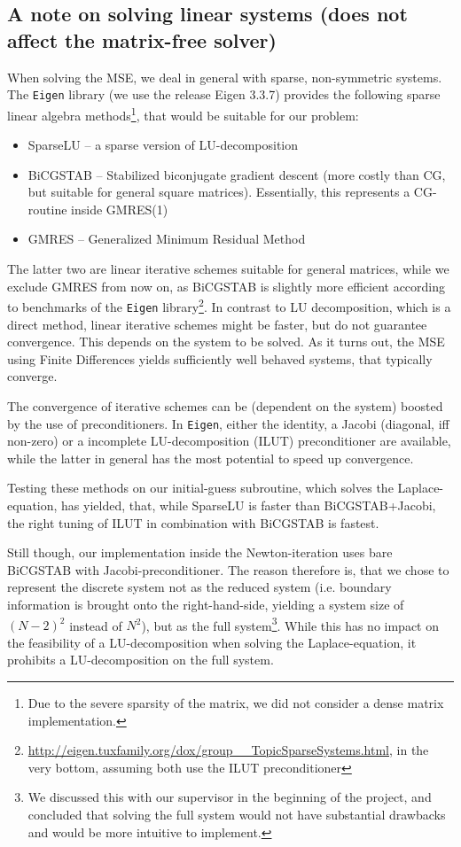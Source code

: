 \documentclass[11pt]{scrartcl}
\begin{document}
\subsection[A note on solving linear systems]{A note on solving linear systems (does not affect the matrix-free solver)}
When solving the MSE, we deal in general with sparse, non-symmetric systems. The \texttt{Eigen} library (we use the release Eigen 3.3.7) provides the following sparse linear algebra methods\footnote{Due to the severe sparsity of the matrix, we did not consider a dense matrix implementation.}, that would be suitable for our problem:
\begin{itemize}
	\item SparseLU -- a sparse version of LU-decomposition 
	\item BiCGSTAB -- Stabilized biconjugate gradient descent (more costly than CG, but suitable for general square matrices). Essentially, this represents a CG-routine inside GMRES(1)
	\item GMRES -- Generalized Minimum Residual Method 
\end{itemize}
The latter two are linear iterative schemes suitable for general matrices, while we exclude GMRES from now on, as BiCGSTAB is slightly more efficient according to benchmarks of the \texttt{Eigen} library\footnote{\url{http://eigen.tuxfamily.org/dox/group__TopicSparseSystems.html}, in the very bottom, assuming both use the ILUT preconditioner}. In contrast to LU decomposition, which is a direct method, linear iterative schemes might be faster, but do not guarantee convergence. This depends on the system to be solved. As it turns out, the MSE using Finite Differences yields sufficiently well behaved systems, that typically converge.

The convergence of iterative schemes can be (dependent on the system) boosted by the use of preconditioners. In \texttt{Eigen}, either the identity, a Jacobi (diagonal, iff non-zero) or a incomplete LU-decomposition (ILUT) preconditioner are available, while the latter in general has the most potential to speed up convergence. 

Testing these methods on our initial-guess subroutine, which solves the Laplace-equation, has yielded, that, while SparseLU is faster than BiCGSTAB+Jacobi, the right tuning of ILUT in combination with BiCGSTAB is fastest. 

Still though, our implementation inside the Newton-iteration uses bare BiCGSTAB with Jacobi-preconditioner. The reason therefore is, that we chose to represent the discrete system not as the reduced system (i.e. boundary information is brought onto the right-hand-side, yielding a system size of $(N-2)^2$ instead of $N^2$), but as the full system\footnote{We discussed this with our supervisor in the beginning of the project, and concluded that solving the full system would not have substantial drawbacks and would be more intuitive to implement.}. While this has no impact on the feasibility of a LU-decomposition when solving the Laplace-equation, it prohibits a LU-decomposition on the full system. 
\end{document}
